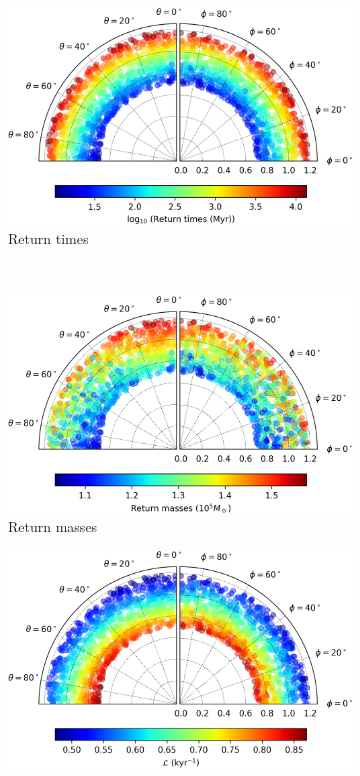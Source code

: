 	\begin{figure}[h]
		\centering
		\begin{subfigure}[t]{0.49\textwidth}
			\includegraphics[width = \textwidth]{"../Files/Week 13/biggerD_time"}
			\caption{Return times}
			\label{fig: biggerD_time}
		\end{subfigure}
		~ 
		\begin{subfigure}[t]{0.49\textwidth}
			\includegraphics[width=\textwidth]{"../Files/Week 13/biggerD_mass"}
			\caption{Return masses}
			\label{fig: biggerD_mass}
		\end{subfigure}
		\begin{subfigure}[t]{0.6\textwidth}
			\includegraphics[width=\textwidth]{"../Files/Week 13/biggerD_lyapunov"}

\end{subfigure}
\end{figure}
